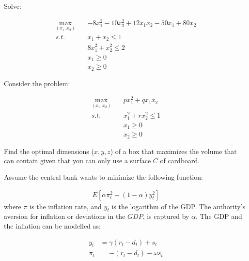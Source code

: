 \documentclass[answers]{exam}
\begin{document}
\begin{questions}
\question Solve:

\begin{align*}
    \max_{(x_1,x_2)}\quad & -8x_1^2-10x_2^2+12x_1x_2-50x_1+80x_2\\
    s.t.\quad & x_1+x_2\leq 1\\
    & 8x_1^2+x_2^2\leq 2\\
    &x_1\geq 0\\
    &x_2\geq 0
\end{align*}

\question Consider the problem:

\begin{align*}
    \max_{(x_1,x_2)}\quad & px_1^2+qx_1x_2\\
    s.t. \quad & x_1^2+rx_2^2\leq 1\\
    &x_1\geq0\\
    &x_2\geq0
\end{align*}


\question Find the optimal dimensions ($x,y,z$) of a box that maximizes the volume that can contain given that you can only use a surface $C$ of cardboard.

\question Assume the central bank wants to minimize the following function:

\begin{align*}
    E[\alpha\pi_t^2+(1-\alpha)y_t^2]
\end{align*}
where $\pi$ is the inflation rate, and $y_t$ is the logarithm of the GDP. The authority's aversion for inflation or deviations in the $GDP$, is captured by $\alpha$. The GDP and the inflation can be modelled as:

\begin{align*}
    y_t &= \gamma(r_t-d_t)+s_t\\
    \pi_t &= -(r_t-d_t)-\omega s_t
\end{align*}


\end{questions}
\end{document}
